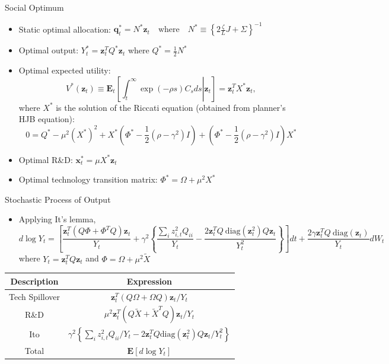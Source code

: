 \documentclass[
  aspectratio=169,  %
]{beamer}
\theoremstyle{plain}
\begin{document}
%
\begin{frame}{Social Optimum }

  \label{optimal}
  \begin{itemize}
    \item Static optimal allocation: $\symbf{q}_{t}^{*}=N^{*}\symbf{z}_{t}\quad\text{where}\quad N^{*}\equiv\left\{ 2\frac{\zeta}{L}J+\Sigma\right\} ^{-1}$
    \item Optimal output: $Y_{t}^{*}=\symbf{z}_{t}^{T}Q^{*}\symbf{z}_{t}$
          where $Q^{*}=\frac{1}{2}N^{*}$
    \item Optimal expected utility:
          \[
            V^{*}\left(\symbf{z}_{t}\right)\equiv\symbf{E}_{t}\left[\left.\int_{t}^{\infty}\exp\left(-\rho s\right)C_{s}ds\right|\symbf{z}_{t}\right]=\symbf{z}_{t}^{T}X^{*}\symbf{z}_{t},
          \]
          where $X^{*}$ is the solution of the Riccati equation (obtained
          from planner's HJB equation):
          \[
            0=Q^{*}-\mu^{2}\left(X^{*}\right)^{2}+X^{*}\left(\Phi^{*}-\frac{1}{2}\left(\rho-\gamma^{2}\right)I\right)+\left(\Phi^{*}-\frac{1}{2}\left(\rho-\gamma^{2}\right)I\right)X^{*}
          \]
    \item Optimal R\&D: $\symbf{x}_{t}^{*}=\mu X^{*}\symbf{z}_{t}$
    \item Optimal technology transition matrix: $\Phi^{*}=\Omega+\mu^{2}X^{*}$
  \end{itemize}
  \hyperlink{aggregation}{}
\end{frame}
%
\begin{frame}{Stochastic Process of Output}

  \label{Y_process}
  \begin{itemize}
    \item Applying It's lemma, {\footnotesize
          \[
            d\log Y_{t}=\left[\frac{\symbf{z}_{t}^{T}\left(Q\Phi+\Phi^{T}Q\right)\symbf{z}_{t}}{Y_{t}}+\gamma^{2}\left\{ \frac{\sum_{i}z_{i,t}^{2}Q_{ii}}{Y_{t}}-\frac{2\symbf{z}_{t}^{T}Q\ \text{diag}\left(\symbf{z}_{t}^{2}\right)Q\symbf{z}_{t}}{Y_{t}^{2}}\right\} \right]dt+\frac{2\gamma\symbf{z}_{t}^{T}Q\ \text{diag}\left(\symbf{z}_{t}\right)}{Y_{t}}dW_{t}
          \]
          }where $Y_{t}=\symbf{z}_{t}^{T}Q\symbf{z}_{t}$ and $\Phi=\Omega+\mu^{2}\widetilde{X}$
  \end{itemize}
  \begin{center}
    \begin{tabular}{cc}
      \hline
      \hline Description & Expression\tabularnewline
      \hline
      Tech Spillover     & $\symbf{z}_{t}^{T}\left(Q\Omega+\Omega Q\right)\symbf{z}_{t}/Y_{t}$\tabularnewline
      R\&D               & $\mu^{2}\symbf{z}_{t}^{T}\left(Q\widetilde{X}+\widetilde{X}^{T}Q\right)\symbf{z}_{t}/Y_{t}$\tabularnewline
      Ito                & $\gamma^{2}\left\{ \sum_{i}z_{i,t}^{2}Q_{ii}/Y_{t}-2\symbf{z}_{t}^{T}Q\text{diag}\left(\symbf{z}_{t}^{2}\right)Q\symbf{z}_{t}/Y_{t}^{2}\right\} $\tabularnewline
      \hline
      Total              & $\symbf{E}\left[d\log Y_{t}\right]$\tabularnewline
      \hline
    \end{tabular}
    \par\end{center}
\end{frame}
\end{document}
